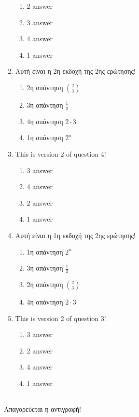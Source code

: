 \documentclass[a4paper, 11pt]{article}
\begin{document}
\begin{enumerate}
\begin{enumerate}[(1)]
    \item 2 answer
    \item 3 answer
    \item 4 answer
    \item 1 answer
\end{enumerate}
\item Αυτή είναι η 2η εκδοχή της 2ης ερώτησης!
\begin{enumerate}[(1)]
    \item 2η απάντηση $\binom{2}{3}$
    \item 3η απάντηση $\frac{1}{2}$
    \item 4η απάντηση $2\cdot 3$
    \item 1η απάντηση $2^n$
\end{enumerate}
\item This is version 2 of question 4!
\begin{enumerate}[(1)]
    \item 3 answer
    \item 4 answer
    \item 2 answer
    \item 1 answer
\end{enumerate}
\item Αυτή είναι η 1η εκδοχή της 2ης ερώτησης!
\begin{enumerate}[(1)]
    \item 1η απάντηση $2^n$
    \item 3η απάντηση $\frac{1}{2}$
    \item 2η απάντηση $\binom{2}{3}$
    \item 4η απάντηση $2\cdot 3$
\end{enumerate}
\item This is version 2 of question 3!
\begin{enumerate}[(1)]
    \item 3 answer
    \item 2 answer
    \item 4 answer
    \item 1 answer
\end{enumerate}
\end{enumerate}
\hrulefill \\ 

Απαγορεύεται η αντιγραφή! 

\newpage 
\end{document}
